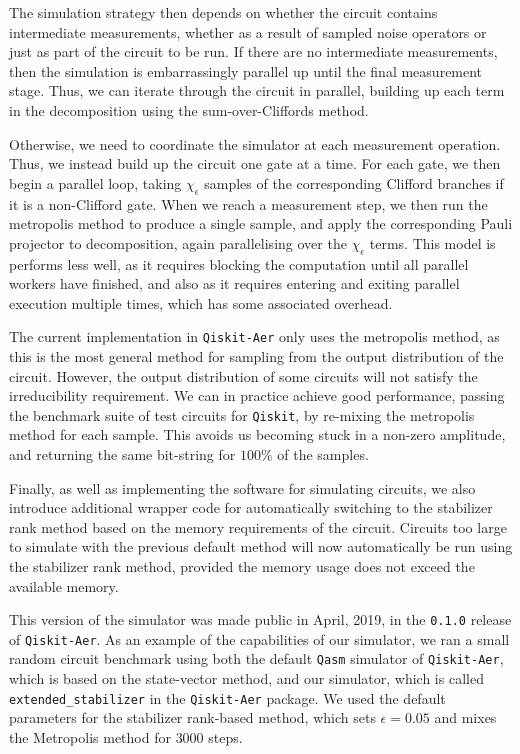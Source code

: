 The simulation strategy then depends on whether the circuit contains intermediate measurements, whether as a result of sampled noise operators or just as part of the circuit to be run. If there are no intermediate measurements, then the simulation is embarrassingly parallel up until the final measurement stage. Thus, we can iterate through the circuit in parallel, building up each term in the decomposition using the sum-over-Cliffords method.\par
Otherwise, we need to coordinate the simulator at each measurement operation. Thus, we instead build up the circuit one gate at a time. For each gate, we then begin a parallel loop, taking $\chi_{\epsilon}$ samples of the corresponding Clifford branches if it is a non-Clifford gate. When we reach a measurement step, we then run the metropolis method to produce a single sample, and apply the corresponding Pauli projector to decomposition, again parallelising over the $\chi_{\epsilon}$ terms. This model is performs less well, as it requires blocking the computation until all parallel workers have finished, and also as it requires entering and exiting parallel execution multiple times, which has some associated overhead.\par
The current implementation in \texttt{Qiskit-Aer} only uses the metropolis method, as this is the most general method for sampling from the output distribution of the circuit. However, the output distribution of some circuits will not satisfy the irreducibility requirement. We can in practice achieve good performance, passing the benchmark suite of test circuits for \texttt{Qiskit}, by re-mixing the metropolis method for each sample. This avoids us becoming stuck in a non-zero amplitude, and returning the same bit-string for $100\%$ of the samples.\par
Finally, as well as implementing the software for simulating circuits, we also introduce additional wrapper code for automatically switching to the stabilizer rank method based on the memory requirements of the circuit. Circuits too large to simulate with the previous default method will now automatically be run using the stabilizer rank method, provided the memory usage does not exceed the available memory.\par
This version of the simulator was made public in April, 2019, in the \texttt{0.1.0} release of \texttt{Qiskit-Aer}. As an example of the capabilities of our simulator, we ran a small random circuit benchmark using both the default \texttt{Qasm} simulator of \texttt{Qiskit-Aer}, which is based on the state-vector method, and our simulator, which is called \texttt{extended\_stabilizer} in the \texttt{Qiskit-Aer} package. We used the default parameters for the stabilizer rank-based method, which sets $\epsilon=0.05$ and mixes the Metropolis method for $3000$ steps.\par
